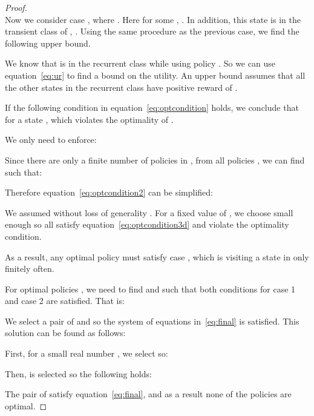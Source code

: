 \begin{proof}
\\
Now we consider case , where .  Here for some , . In addition, this state is in the transient class of , .
Using the same procedure as the previous case, we find the following upper bound.







We know that  is in the recurrent class while using policy . So we can use equation~\eqref{eq:ur} to find a bound on the utility. An upper bound assumes that all the other states in the recurrent class have positive reward of .



If the following condition in equation~\eqref{eq:optcondition} holds, we conclude that for a state ,   which violates the optimality of .



We only need to enforce:


Since there are only a finite number of policies in , from all policies , we can find  such that:


Therefore equation~\eqref{eq:optcondition2} can be simplified:




We assumed without loss of generality . For a fixed value of , we choose  small enough so all  satisfy equation~\eqref{eq:optcondition3d} and violate the optimality condition.

As a result, any optimal policy must satisfy case , which is visiting a state in  only finitely often.

For optimal policies , we need to find  and  such that both conditions for case 1 and case 2 are satisfied. That is:



We select a pair of  and  so the system of equations in~\eqref{eq:final} is satisfied. This solution can be found as follows:

First, for a small real number , we select  so:



Then,  is selected so the following holds:


The pair of  satisfy equation~\eqref{eq:final}, and as a result none of the policies  are optimal.
\end{proof}
















